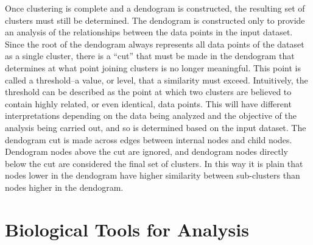 \documentclass[12pt]{ucthesis}
\begin{document}
         Once clustering is complete and a dendogram is constructed, the
         resulting set of clusters must still be determined. The dendogram is
         constructed only to provide an analysis of the relationships between
         the data points in the input dataset. Since the root of the dendogram
         always represents all data points of the dataset as a single cluster,
         there is a ``cut'' that must be made in the dendogram that determines
         at what point joining clusters is no longer meaningful. This point is
         called a threshold--a value, or level, that a similarity must exceed.
         Intuitively, the threshold can be described as the point at which two
         clusters are believed to contain highly related, or even identical,
         data points. This will have different interpretations depending on the
         data being analyzed and the objective of the analysis being carried
         out, and so is determined based on the input dataset. The dendogram
         cut is made across edges between internal nodes and child nodes.
         Dendogram nodes above the cut are ignored, and dendogram nodes
         directly below the cut are considered the final set of clusters. In
         this way it is plain that nodes lower in the dendogram have higher
         similarity between sub-clusters than nodes higher in the dendogram.

\chapter{Biological Tools for Analysis}\label{chap:other_contributions}
\end{document}
